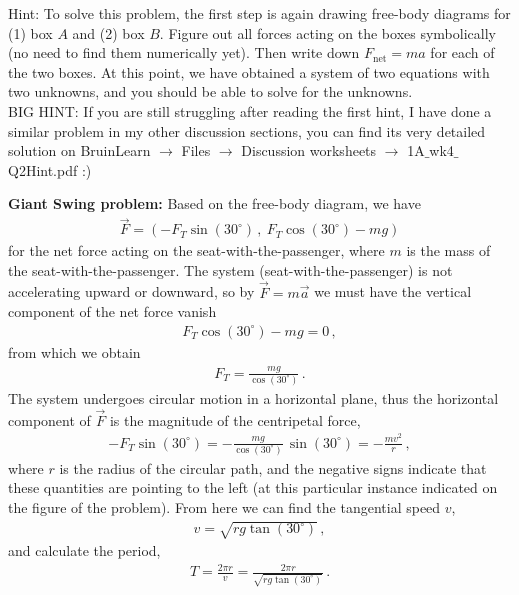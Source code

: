 \documentclass[11pt]{article}
\begin{document}
\vfill
\noindent Hint: \color{gray} To solve this problem, the first step is again drawing free-body diagrams for (1) box $A$ and (2) box $B$. Figure out all forces acting on the boxes symbolically (no need to find them numerically yet). Then write down $F_{\text{net}} = ma$ for each of the two boxes. At this point, we have obtained a system of two equations with two unknowns, and you should be able to solve for the unknowns.\\

\noindent \color{black}BIG HINT: \color{gray} If you are still struggling after reading the first hint, I have done a similar problem in my other discussion sections, you can find its very detailed solution on BruinLearn $\to$ Files $\to$ Discussion worksheets $\to$ 1A$\_$wk4$\_$Q2Hint.pdf \quad :)


\newpage
\color{black}
\textbf{Giant Swing problem:}
Based on the free-body diagram, we have
\begin{align*}
\vec{F} = \left(- F_T \sin(30^\circ) \,,\ F_T\cos(30^\circ)-mg\right)
\end{align*}
for the net force acting on the seat-with-the-passenger, where $m$ is the mass of the seat-with-the-passenger. The system (seat-with-the-passenger) is not accelerating upward or downward, so by $\vec{F} = m\vec{a}$ we must have the vertical component of the net force vanish
\begin{align*}
F_T\cos(30^\circ)-mg = 0\,,
\end{align*}
from which we obtain 
\begin{align*}
F_T = \frac{mg}{\cos(30^\circ)}\,.
\end{align*}
The system undergoes circular motion in a horizontal plane, thus the horizontal component of $\vec{F}$ is the magnitude of the centripetal force, 
\begin{align*}
-F_T \sin(30^\circ) =- \frac{mg }{\cos(30^\circ)}\,\sin(30^\circ) = -\frac{mv^2}{r}\,,
\end{align*}
where $r$ is the radius of the circular path, and the negative signs indicate that these quantities are pointing to the left (at this particular instance indicated on the figure of the problem). From here we can find the tangential speed $v$, 
\begin{align*}
v = \sqrt{rg\tan(30^\circ)}\,,
\end{align*}
and calculate the period,
\begin{align*}
T = \frac{2\pi r}{v} = \frac{2\pi r}{\sqrt{rg \tan(30^\circ)}}\,.
\end{align*}
\end{document}
